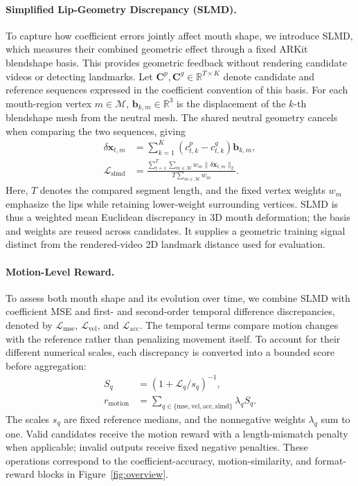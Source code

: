 \paragraph{Simplified Lip-Geometry Discrepancy (SLMD).}
To capture how coefficient errors jointly affect mouth shape, we introduce SLMD, which measures their combined geometric effect through a fixed ARKit blendshape basis.
This provides geometric feedback without rendering candidate videos or detecting landmarks.
Let $\mathbf{C}^{p},\mathbf{C}^{g}\in\mathbb{R}^{T\times K}$ denote candidate and reference sequences expressed in the coefficient convention of this basis.
For each mouth-region vertex $m\in\mathcal{M}$, $\mathbf{b}_{k,m}\in\mathbb{R}^{3}$ is the displacement of the $k$-th blendshape mesh from the neutral mesh.
The shared neutral geometry cancels when comparing the two sequences, giving
\begin{align}
\delta\mathbf{x}_{t,m} &= \sum_{k=1}^{K}(c^p_{t,k}-c^g_{t,k})\mathbf{b}_{k,m}, \label{eq:slmd_displacement}\\
\mathcal{L}_{\mathrm{slmd}} &= \frac{\sum_{t=1}^{T}\sum_{m\in\mathcal{M}}w_m\|\delta\mathbf{x}_{t,m}\|_2}{T\sum_{m\in\mathcal{M}}w_m}. \label{eq:slmd}
\end{align}
Here, $T$ denotes the compared segment length, and the fixed vertex weights $w_m$ emphasize the lips while retaining lower-weight surrounding vertices.
SLMD is thus a weighted mean Euclidean discrepancy in 3D mouth deformation; the basis and weights are reused across candidates.
It supplies a geometric training signal distinct from the rendered-video 2D landmark distance used for evaluation.

\paragraph{Motion-Level Reward.}
To assess both mouth shape and its evolution over time, we combine SLMD with coefficient MSE and first- and second-order temporal difference discrepancies, denoted by $\mathcal{L}_{\mathrm{mse}}$, $\mathcal{L}_{\mathrm{vel}}$, and $\mathcal{L}_{\mathrm{acc}}$.
The temporal terms compare motion changes with the reference rather than penalizing movement itself.
To account for their different numerical scales, each discrepancy is converted into a bounded score before aggregation:
\begin{align}
S_q &= \left(1+\mathcal{L}_q/s_q\right)^{-1}, \label{eq:normalized_score}\\
r_{\mathrm{motion}} &= \sum_{q\in\{\mathrm{mse},\mathrm{vel},\mathrm{acc},\mathrm{slmd}\}}\lambda_q S_q. \label{eq:motion_reward}
\end{align}
The scales $s_q$ are fixed reference medians, and the nonnegative weights $\lambda_q$ sum to one.
Valid candidates receive the motion reward with a length-mismatch penalty when applicable; invalid outputs receive fixed negative penalties.
These operations correspond to the coefficient-accuracy, motion-similarity, and format-reward blocks in Figure~\ref{fig:overview}.

